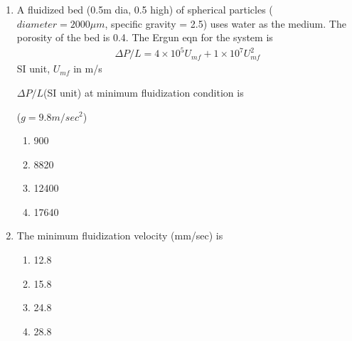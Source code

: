 \documentclass[journal,12pt,onecolumn]{IEEEtran}
\theoremstyle{remark}
\begin{document}
\begin{enumerate}
    \item A fluidized bed (0.5m dia, 0.5 high) of spherical particles ($diameter = 2000\mu m$, specific gravity = 2.5) uses water as the medium. The porosity of the bed is 0.4. The Ergun eqn for the system is 
    \begin{align*}
        \Delta P/L = 4\times 10^5 U_{mf}+1\times 10^7 U_{mf}^2 
    \end{align*}
    SI unit, $U_{mf}$ in m/s 
    
    $\Delta P/L$(SI unit) at minimum fluidization condition is 
    
    ($g=9.8m/sec^2$)

\begin{multicols}{4}
    \begin{enumerate}
        \item 900
        \item 8820
        \item 12400
        \item 17640
    \end{enumerate}
\end{multicols}

    \item The minimum fluidization velocity (mm/sec) is

 \begin{multicols}{4}
     \begin{enumerate}
         \item 12.8
         \item 15.8
         \item 24.8
         \item 28.8
     \end{enumerate}
 \end{multicols}














 \end{enumerate}
\end{document}
